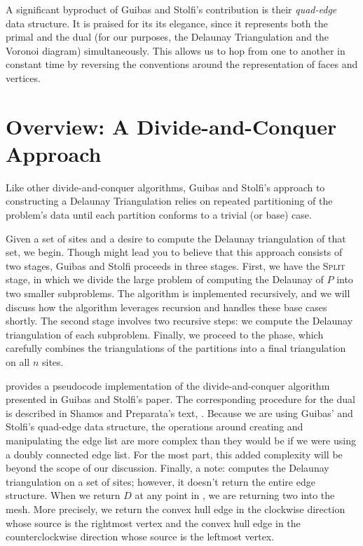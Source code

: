 \documentclass[12pt,twoside]{reedthesis}
\begin{document}
    A significant byproduct of Guibas and Stolfi's contribution is their \emph{quad-edge} data structure. It is praised for its its elegance, since it represents both the primal and the dual (for our purposes, the Delaunay Triangulation and the Voronoi diagram) simultaneously. This allows us to hop from one to another in constant time by reversing the conventions around the representation of faces and vertices.\par

  \section{Overview: A Divide-and-Conquer Approach}
  \label{gs_sketch}
    Like other divide-and-conquer algorithms, Guibas and Stolfi's approach to constructing a Delaunay Triangulation relies on repeated partitioning of the problem's data until each partition conforms to a trivial (or base) case.\par

    Given a set of sites and a desire to compute the Delaunay triangulation of that set, we begin. Though  might lead you to believe that this approach consists of two stages, Guibas and Stolfi proceeds in three stages. First, we have the \textsc{Split} stage, in which we divide the large problem of computing the Delaunay of $P$ into two smaller subproblems. The algorithm is implemented recursively, and we will discuss how the algorithm leverages recursion and handles these base cases shortly. The second stage involves two recursive steps: we compute the Delaunay triangulation of each subproblem. Finally, we proceed to the  phase, which carefully combines the triangulations of the partitions into a final triangulation on all $n$ sites. \par

     provides a pseudocode implementation of the divide-and-conquer algorithm presented in Guibas and Stolfi's paper. The corresponding procedure for the dual is described in Shamos and Preparata's text, \cite[p.~206]{shamos}. Because we are using Guibas’ and Stolfi’s quad-edge data structure, the operations around creating and manipulating the edge list are more complex than they would be if we were using a doubly connected edge list. For the most part, this added complexity will be beyond the scope of our discussion. Finally, a note:  computes the Delaunay triangulation on a set of sites; however, it doesn't return the entire edge structure. When we return $D$ at any point in , we are returning two  into the mesh. More precisely, we return the convex hull edge in the clockwise direction whose source is the rightmost vertex and the convex hull edge in the counterclockwise direction whose source is the leftmost vertex.\par 
\end{document}
